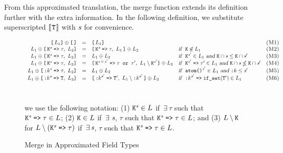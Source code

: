 \documentclass{article}
\begin{document}
From this approximated translation, the merge function extends its definition further with the extra information.
In the following definition, we substitute superscripted $[\![\hspace{.07em}\texttt{T}\hspace{.07em}]\!]$ with $\textit{s}$ for convenience.

\begin{figure} [H]
   \[\begin{array}{rclll}
      \texttt{[}\,L_1\texttt{]} \oplus \texttt{[\,]} &=& \texttt{[}\,L_1\texttt{]} && \textsc{(M1)} \\
      L_1 \oplus \texttt{[}\,\ETK^{\orgtype}\fto\tau,\,\,L_2\texttt{]} &=& \texttt{[}\,\ETK^{\orgtype}\fto\tau,\,\,L_1\,\texttt{]} \oplus L_2 & \textsl{if }\ \ETK\not\in L_1 & \textsc{(M2)} \\
      L_1 \oplus \texttt{[}\,\ETK^{\orgtype}\fto\tau,\,\,L_2\texttt{]} &=& L_1 \oplus L_2 & \textsl{if }\ \ETK^{\prm{\orgtype}} \in L_1 \textsl{ and } \ETK \cap {\orgtype} \leq \ETK \cap \prm{\orgtype} & \textsc{(M3)} \\
      L_1 \oplus \texttt{[}\,\ETK^{\orgtype}\fto\tau,\,\,L_2\texttt{]} &=& \texttt{[}\,\ETK^{\orgtype\,\vee\,\prm{\orgtype}}\fto\tau \texttt{ or }\prm{\tau},\,\,L_1 \setminus \ETK^{\prm{\orgtype}}\texttt{]} \oplus L_2  & \textsl{if }\ \ETK^{\prm{\orgtype}}\fto\prm{\tau} \in L_1 \textsl{ and } \ETK \cap \orgtype \nleq \ETK \cap \prm{\orgtype} & \textsc{(M4)} \\
      L_1 \oplus \texttt{[}\,\SAtom^{\orgtype}\fto\tau,\,\,L_2\texttt{]} &=& L_1 \oplus L_2 & \textsl{if }\ \texttt{atom()}^{\prm{\orgtype}} \in L_1 \textsl{ and } \SAtom \leq \prm{\orgtype} & \textsc{(M5)} \\
      L_1 \oplus \texttt{[}\,\SAtom^{\orgtype}\fto\ETT,\,\,L_2\texttt{]} &=& \texttt{[}\,\SAtom^{\prm{\orgtype}}\fto\prm{\ETT},\,\,L_1 \setminus \SAtom^{\prm{\orgtype}}\,\texttt{]} \oplus L_2 & \textsl{if }\ \SAtom^{\prm{\orgtype}}\fto\texttt{if\_set}(\prm{\ETT}) \in L_1 & \textsc{(M6)} \\
      \\
   \end{array}\]
   \\[4mm] we use the following notation: (1) $\texttt{K}^{\textit{s}} \in L$ if $\,\exists\ \tau$ such that $\texttt{K}^{\textit{s}}\;\texttt{=>}\;\tau \in L$; (2) $\texttt{K} \in L$ if $\,\exists\ \textit{s}$, $\tau$ such that $\texttt{K}^{\textit{s}}\;\texttt{=>}\;\tau \in L$; and (3) $L \setminus \texttt{K}$ for $L \setminus (\texttt{K}^{\textit{s}}\;\texttt{=>}\;\tau)$ if $\,\exists\, \textit{s}$, $\tau$ such that $\texttt{K}^{\textit{s}}\;\texttt{=>}\;\tau \in L$.
   \caption{Merge in Approximated Field Types}
   \label{app:merge-in-approximated-field-types}
\end{figure}
\end{document}
